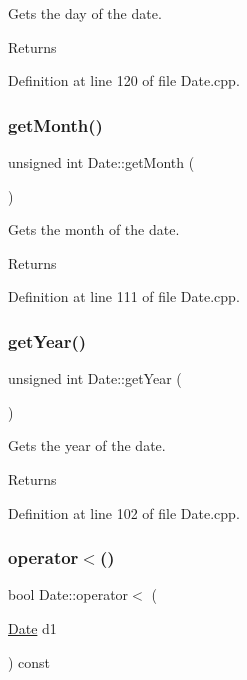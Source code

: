 Gets the day of the date. \begin{DoxyReturn}{Returns}

\end{DoxyReturn}


Definition at line 120 of file Date.\+cpp.

\mbox{\label{classDate_a9efc6db1870de82dbd717f1c3c782f82}} 
\subsubsection{\texorpdfstring{get\+Month()}{getMonth()}}
{\footnotesize\ttfamily unsigned int Date\+::get\+Month (\begin{DoxyParamCaption}{ }\end{DoxyParamCaption})}

Gets the month of the date. \begin{DoxyReturn}{Returns}

\end{DoxyReturn}


Definition at line 111 of file Date.\+cpp.

\mbox{\label{classDate_a90be6a509b91ee9addfeec0e68b965e2}} 
\subsubsection{\texorpdfstring{get\+Year()}{getYear()}}
{\footnotesize\ttfamily unsigned int Date\+::get\+Year (\begin{DoxyParamCaption}{ }\end{DoxyParamCaption})}

Gets the year of the date. \begin{DoxyReturn}{Returns}

\end{DoxyReturn}


Definition at line 102 of file Date.\+cpp.

\mbox{\label{classDate_a2fdc0ec866aa7e1b3f8e1a7468663827}} 
\subsubsection{\texorpdfstring{operator$<$()}{operator<()}}
{\footnotesize\ttfamily bool Date\+::operator$<$ (\begin{DoxyParamCaption}\item[{\hyperlink{classDate}{Date}}]{d1 }\end{DoxyParamCaption}) const}

